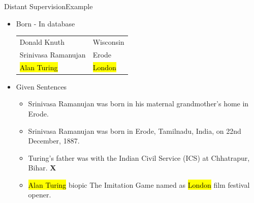 \documentclass{beamer}
\makeatletter
\newcommand\SoulColor{%
  \let\set@color\beamerorig@set@color
  \let\reset@color\beamerorig@reset@color}
\makeatother
\begin{document}
\begin{frame}{Distant Supervision}{Example}
\begin{itemize}
 
\item Born - In database
 \begin{center}
\begin{tabular}{|l|l|}
\hline
Donald Knuth & Wisconsin \\
Srinivasa Ramanujan & Erode \\
\SoulColor\hl{Alan Turing} & \SoulColor\hl{London} \\
\hline
\end{tabular}
\end{center}
\item Given Sentences
\begin{itemize}
\item Srinivasa Ramanujan was born in his maternal grandmother’s home in Erode. \checkmark
\item Srinivasa Ramanujan was born in Erode, Tamilnadu, India, on 22nd December, 1887.  \checkmark
\item Turing's father was with the Indian Civil Service (ICS) at Chhatrapur, Bihar.  \textbf{X}
\item \alert<+> {\SoulColor\hl{Alan Turing} biopic The Imitation Game named as \SoulColor\hl{London} film festival opener.} \checkmark
\end{itemize}
\end{itemize}
 
\end{frame}
\end{document}

